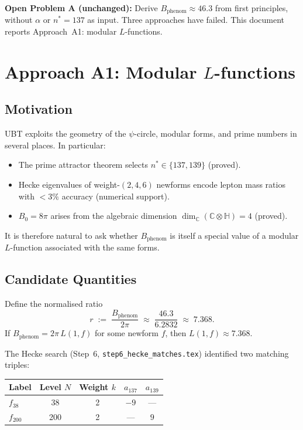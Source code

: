 \documentclass[12pt,a4paper]{article}
\theoremstyle{definition}
\theoremstyle{remark}
\begin{document}
\begin{gapbox}
\textbf{Open Problem A (unchanged):}
Derive $B_{\mathrm{phenom}} \approx 46.3$ from first principles,
without $\alpha$ or $n^* = 137$ as input.
Three approaches have failed.  This document reports Approach~A1:
modular $L$-functions.
\end{gapbox}

\section{Approach A1: Modular $L$-functions}
\label{sec:approach_A1}

\subsection{Motivation}
\label{subsec:A1_motivation}

UBT exploits the geometry of the $\psi$-circle, modular forms, and prime
numbers in several places.  In particular:
\begin{itemize}
  \item The prime attractor theorem selects $n^* \in \{137, 139\}$ (proved).
  \item Hecke eigenvalues of weight-$(2,4,6)$ newforms encode lepton mass
        ratios with $< 3\%$ accuracy (numerical support).
  \item $B_0 = 8\pi$ arises from the algebraic dimension $\dim_\mathbb{C}(\mathbb{C}\otimes\mathbb{H}) = 4$ (proved).
\end{itemize}
It is therefore natural to ask whether $B_{\mathrm{phenom}}$ is itself a
special value of a modular $L$-function associated with the same forms.

\subsection{Candidate Quantities}
\label{subsec:A1_candidates}

Define the normalised ratio
\begin{equation}
  r \;:=\; \frac{B_{\mathrm{phenom}}}{2\pi} \;\approx\; \frac{46.3}{6.2832}
        \;\approx\; 7.368.
\end{equation}
If $B_{\mathrm{phenom}} = 2\pi\,L(1,f)$ for some newform $f$, then
$L(1,f) \approx 7.368$.

The Hecke search (Step~6, \texttt{step6\_hecke\_matches.tex}) identified
two matching triples:
\begin{center}
\begin{tabular}{lcccc}
  \toprule
  Label & Level $N$ & Weight $k$ & $a_{137}$ & $a_{139}$ \\
  \midrule
  $f_{38}$ & 38 & 2 & $-9$ & --- \\
  $f_{200}$ & 200 & 2 & --- & $9$ \\
  \bottomrule
\end{tabular}
\end{center}
\end{document}
